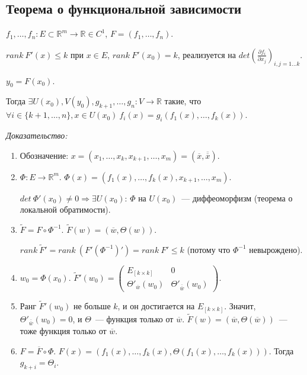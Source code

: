 \documentclass[paper=a4, fontsize=11pt]{article}
\begin{document}
\subsection{Теорема о функциональной зависимости}
$f_1,\dots,f_n: E \subset \mathds{R}^m \to \mathds{R} \in C^1$, $F = (f_1,\dots,f_n)$.

$rank\ F'(x) \leq k$ при $x \in E$, $rank\ F'(x_0) = k$, реализуется на $det(\frac{\partial f_i}{\partial x_j})_{i,j=1\dots k}$.

$y_0 = F(x_0)$.

Тогда $\exists U(x_0),V(y_0), g_{k+1},\dots,g_n:V \rightarrow \mathds{R}$ такие, что
$\forall i \in \{k+1,\dots,n\},x \in U(x_0)\ f_i(x) = g_i(f_1(x),\dots,f_k(x))$.

\emph{Доказательство:}
\begin{enumerate}
    \item Обозначение: $x = (x_1,\dots,x_k,x_{k+1},\dots,x_m) = (\overline{x},\overline{\overline{x}})$.
    \item $\Phi: E \rightarrow \mathds{R}^m$. $\Phi(x) = (f_1(x),\dots,f_k(x),x_{k+1},\dots,x_m)$.

    $det\ \Phi'(x_0) \neq 0 \Rightarrow \exists U(x_0)$: $\Phi$ на $U(x_0)$~--- диффеоморфизм (теорема о локальной обратимости).
    \item $\widetilde{F} = F \circ \Phi^{-1}$. $\widetilde{F}(w) = (\overline{w},\Theta(w))$.

    $rank\ \widetilde{F}' = rank\ (F' (\Phi^{-1})') = rank\ F' \leq k$ (потому что $\Phi^{-1}$ невырождено).

    \item $w_0 = \Phi(x_0)$. $\widetilde{F}'(w_0) = 
    \begin{pmatrix}
        E_{[k \times k]} & 0\\
        \Theta'_{\overline{w}}(w_0) & \Theta'_{\overline{\overline{w}}}(w_0)
    \end{pmatrix}
    $.
    \item Ранг $\widetilde{F}'(w_0)$ не больше $k$, и он достигается на $E_{[k \times k]}$.
    Значит, $\Theta'_{\overline{\overline{w}}}(w_0) = 0$, и $\Theta$~--- функция только от $\overline{w}$.
    $\widetilde{F}(w) = (\overline{w}, \Theta(\overline{w}))$~--- тоже функция только от $\overline{w}$.
    \item $F = \overline{F} \circ \Phi$. $F(x) = (f_1(x),\dots,f_k(x),\Theta(f_1(x),\dots,f_k(x)))$.
    Тогда $g_{k+i} = \Theta_i$.
\end{enumerate}
\end{document}
